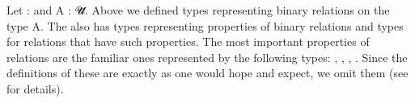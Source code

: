 \documentclass[a4paper,UKenglish,cleveref,autoref,thm-restate,11pt]{lipics-v2021}
\begin{document}
Let  \as :  and \ab A \as : \ab 𝓤\af ̇.
Above we defined types representing binary relations on the type \ab A.
The \ualib also has types representing properties of binary relations and types for relations that have such properties. The most important properties of relations are the familiar ones represented by the following types: , , , .  Since the definitions of these are exactly as one would hope and expect, we omit them (see \ualibDiscrete for details).
\end{document}
